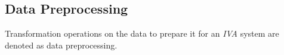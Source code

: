 \documentclass[journal]{style/vgtc} 			          %
\begin{document}
% 

\subsection{Data Preprocessing} \label{Data Preprocessing}
Transformation operations on the data to prepare it for an \emph{IVA} system are denoted as data preprocessing.
\end{document}
